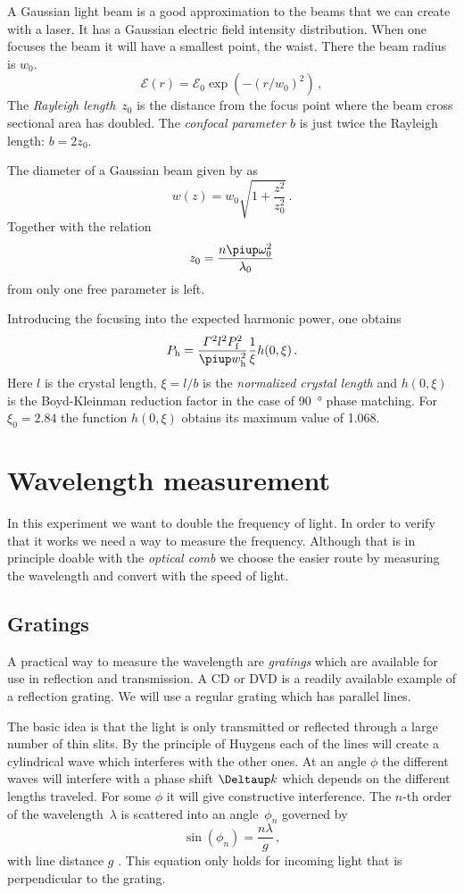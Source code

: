 \documentclass[11pt, english, fleqn, DIV=15, headinclude, BCOR=2cm]{scrreprt}
\begin{document}
A Gaussian light beam is a good approximation to the beams that we can create
with a laser. It has a Gaussian electric field intensity distribution. When one
focuses the beam it will have a smallest point, the waist. There the beam
radius is $w_0$.
\[
    \mathcal E(r) = \mathcal E_0 \exp(-(r/w_0)^2) \,,
\]
The \emph{Rayleigh length}~$z_0$ is the distance from the focus point where the
beam cross sectional area has doubled. The \emph{confocal parameter} $b$ is
just twice the Rayleigh length: $b = 2 z_0$.

The diameter of a Gaussian beam given by \parencite{wikipedia/gaussian_beam} as
\[
    w(z) = w_0 \sqrt{1 + \frac{z^2}{z_0^2}} \,.
\]
Together with the relation
\[
    z_0 = \frac{n \piup \omega_0^2}{\lambda_0}
\]
from \parencite{wikipedia/rayleighleange} only one free parameter is left.

Introducing the focusing into the expected harmonic power, one obtains
\[
    P_\mathrm h
    = \frac{\Gamma^2 l^2 P_\mathrm f^2}{\piup w_\mathrm h^2} \frac1\xi h(0,
    \xi) \,.
\]
Here $l$ is the crystal length, $\xi = l / b$ is the \emph{normalized crystal
length} and $h(0, \xi)$ is the Boyd-Kleinman reduction factor in the case of
\SI{90}{\degree} phase matching. For $\xi_0 = 2.84$ the function $h(0, \xi)$
obtains its maximum value of \num{1.068}.

\section{Wavelength measurement}

In this experiment we want to double the frequency of light. In order to verify
that it works we need a way to measure the frequency. Although that is in
principle doable with the \emph{optical comb} we choose the easier route by
measuring the wavelength and convert with the speed of light.

\subsection{Gratings}

A practical way to measure the wavelength are \emph{gratings} which are
available for use in reflection and transmission. A CD or DVD is a readily
available example of a reflection grating. We will use a regular grating which
has parallel lines.


The basic idea is that the light is only transmitted or reflected through a
large number of thin slits. By the principle of Huygens each of the lines will
create a cylindrical wave which interferes with the other ones. At an angle
$\phi$ the different waves will interfere with a phase shift $\Deltaup k$ which
depends on the different lengths traveled. For some $\phi$ it will give
constructive interference. The $n$-th order of the wavelength~$\lambda$ is
scattered into an angle~$\phi_n$ governed by
\[
    \sin(\phi_n) = \frac{n \lambda}{g} \,,
\]
with line distance $g$ \parencite{wikipedia/optisches_gitter}. This equation
only holds for incoming light that is perpendicular to the grating.
\end{document}
